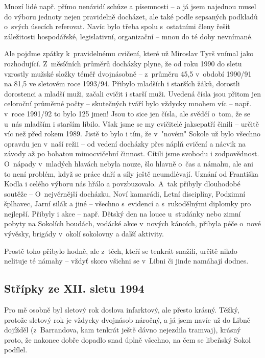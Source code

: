 \documentclass[a5paper, 11pt, twoside]{article}
\begin{document}
Mnozí lidé např. přímo nenávidí schůze a písemnosti -- a já jsem
najednou musel do výboru jednoty nejen pravidelně docházet, ale také
podle sepsaných podkladů o~svých úsecích referovat. Navíc bylo třeba
spolu s~ostatními členy řešit záležitosti hospodářské, legislativní,
organizační -- mnou do té doby nevnímané.

Ale pojďme zpátky k~pravidelnému cvičení, které už Miroslav Tyrš vnímal
jako rozhodující. Z~měsíčních průměrů docházky plyne, že od roku 1990 do
sletu vzrostly mužské složky téměř dvojnásobně -- z~průměru 45,5
v~období 1990/91 na 81,5 ve sletovém roce 1993/94. Přibylo mladších i
starších žáků, dorostli dorostenci a mladší muži, začali cvičit i starší
muži. Uvedená čísla jsou přitom jen celoroční průměrné počty --
skutečných tváří bylo vždycky mnohem víc -- např. v~roce 1991/92 to bylo
125 jmen! Jsou to sice jen čísla, ale svědčí o~tom, že se u~nás mladším
i starším líbilo. Však jsme se my cvičitelé jaksepatří činili -- určitě
víc než před rokem 1989. Jistě to bylo i tím, že v~"novém" Sokole už
bylo všechno opravdu jen v~naší režii -- od vedení docházky přes náplň
cvičení a nácvik na závody až po bohatou mimocvičební činnost. Cítili
jsme svobodu i zodpovědnost. O~nápady v~mladých hlavách nebyla nouze,
šlo hlavně o~čas a námahu, ale ani to není problém, když se práce daří a
síly ještě neumdlévají. Uznání od Františka Kodla i celého výboru nás
hřálo a povzbuzovalo. A~tak přibyly dlouhodobé soutěže -- O~nejvěrnější
docházku, Noví kamarádi, Letní disciplíny, Podzimní šplhavec, Jarní
silák a jiné -- všechno s~evidencí a s~rukodělnými diplomky pro
nejlepší. Přibyly i akce -- např. Dětský den na louce u~studánky nebo
zimní pobyty na Sokolích boudách, vodácké akce v~nových kánoích, přibyla
péče o~nové vývěsky, brigády v~okolí sokolovny a další aktivity.

Prostě toho přibylo hodně, ale z~těch, kteří se tenkrát snažili, určitě
nikdo nelituje té námahy -- vždyť skoro všichni se v~Libni či jinde
namáhají dodnes.

\subsection{Střípky ze XII. sletu
1994}

Pro mě osobně byl sletový rok doslova infarktový, ale přesto krásný.
Těžký, protože sletový rok je vždycky dvojnásob náročný, a já jsem navíc
už do Libně dojížděl (z~Barrandova, kam tenkrát ještě dávno nejezdila
tramvaj), krásný proto, že nakonec dobře dopadlo snad úplně všechno, na
čem se libeňský Sokol podílel.
\end{document}
